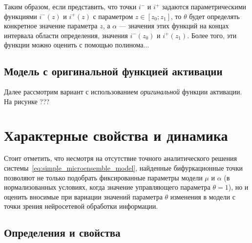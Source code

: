 Таким образом, если представить, что точки $i^{-}$ и $i^{+}$ задаются параметрическими функциями $i^{-}(z)$ и $i^{+}(z)$ с параметром $z \in \left[z_{0}; z_{1}\right]$, то $\theta$ будет определять конкретное значение параметра $z$, а $\alpha$ --- значения этих функций на концах интервала области определения, \ie значения $i^{-}(z_{0})$ и $i^{+}(z_{1})$. Более того, эти функции можно оценить с помощью полинома...


%
%

\newpage
\subsection{Модель с оригинальной функцией активации}

Далее рассмотрим вариант с использованием \textit{оригинальной} функции активации. На рисунке ???

\newpage
\section{Характерные свойства и динамика} \label{section:neuron_dynamic}

Стоит отметить, что несмотря на отсутствие точного аналитического решения системы~\eqref{eq:simple_microensemble_model}, найденные бифуркационные точки позволяют не только подобрать фиксированные параметры модели $\mu$ и $\alpha$ (в нормализованных условиях, когда значение управляющего параметра $\theta = 1$), но и оценить вносимые при вариации значений параметра $\theta$ изменения в модели с точки зрения нейросетевой обработки информации.

\subsection{Определения и свойства}

